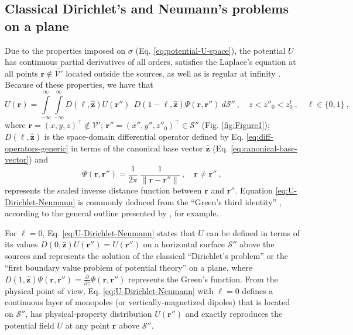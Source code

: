 \subsection{Classical Dirichlet's and Neumann's problems on a plane}
\label{subsec:dirichlet_neumann}

Due to the properties imposed on $\sigma$ (Eq. \ref{eq:potential-U-space}), the potential 
$U$ has continuous partial derivatives of all orders, 
satisfies the Laplace's equation at all points $\mathbf{r} \notin \overline{\mathcal{V}'}$ 
located outside the sources, as well as is regular at infinity \citep[][p. 122--124, 217]{kellogg1967}.
Because of these properties, we have that
\begin{equation}
	U(\mathbf{r}) = 
	\int\limits_{-\infty}^{\infty} \int\limits_{-\infty}^{\infty}
	D(\ell, \hat{\mathbf{z}}) U(\mathbf{r}'') \:\: 
	D(1 - \ell, \hat{\mathbf{z}}) \Psi(\mathbf{r}, \mathbf{r}'')
	\: d\mathcal{S}'' \: , \quad  z < z''_{0} < z^{t}_{0} \: ,
	\quad \ell \in \{0, 1\} \: ,
	\label{eq:U-Dirichlet-Neumann}
\end{equation}
where $\mathbf{r} = (x, y, z)^{\top} \notin \overline{\mathcal{V}'}$; 
$\mathbf{r}'' = (x'', y'', z''_{0})^{\top} \in \mathcal{S}''$ (Fig. \ref{fig:Figure1}); 
$D(\ell, \hat{\mathbf{z}})$ is the space-domain differential operator 
defined by Eq. \ref{eq:diff-operators-generic} in terms of the canonical base vector 
$\hat{\mathbf{z}}$ (Eq. \ref{eq:canonical-base-vector}) and 
\begin{equation}
	\Psi(\mathbf{r}, \mathbf{r}'') = 
	\frac{1}{2\pi} \: 
	\frac{1}{\| \mathbf{r} - \mathbf{r}'' \|} \: , 
	\quad \mathbf{r} \ne \mathbf{r}'' \: ,
	\label{eq:Psi}
\end{equation}
represents the scaled inverse distance function between $\mathbf{r}$ and $\mathbf{r}''$. 
Equation \ref{eq:U-Dirichlet-Neumann} is commonly deduced from 
the ``Green's third identity'' \citep[][p. 219]{kellogg1967}, according to
the general outline presented by \cite{roy1962}, for example.

For $\ell = 0$, Eq. \ref{eq:U-Dirichlet-Neumann} states that $U$ can be defined
in terms of its values $D(0, \hat{\mathbf{z}}) U(\mathbf{r}'') = U(\mathbf{r}'')$ on a horizontal surface $\mathcal{S}''$ 
above the sources and represents the solution of the classical ``Dirichlet’s problem'' or the 
``first boundary value problem of potential theory'' \citep[][p. 236]{kellogg1967} on a plane, where 
$D(1, \hat{\mathbf{z}}) \Psi(\mathbf{r}, \mathbf{r}'') = \tfrac{\partial}{\partial z} \Psi(\mathbf{r}, \mathbf{r}'')$ 
represents the Green's function.
From the physical point of view, Eq. \ref{eq:U-Dirichlet-Neumann} with $\ell = 0$ defines a continuous 
layer of monopoles (or vertically-magnetized dipoles) that is located on $\mathcal{S}''$, has 
physical-property distribution $U(\mathbf{r}'')$ and exactly reproduces the 
potential field $U$ at any point $\mathbf{r}$ above $\mathcal{S}''$.

